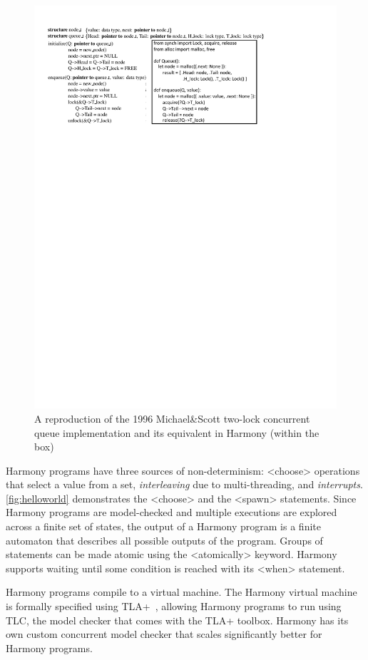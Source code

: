 \documentclass[twocolumn]{article}
\begin{document}
\begin{figure}
\begin{center}
\includegraphics[width=.9\textwidth]{MS.pdf}
\end{center}
\caption{A reproduction of the 1996 Michael\&Scott two-lock concurrent queue
implementation and its equivalent in Harmony (within the box)}
\label{fig:ms}
\end{figure}

Harmony programs have three sources of non-determinism:
<{choose}> operations that select a value from a set,
\emph{interleaving} due to multi-threading, and \emph{interrupts}.
\autoref{fig:helloworld} demonstrates the <{choose}> and the <{spawn}>
statements.  Since Harmony programs are model-checked and multiple
executions are explored across a finite set of states, the output of a
Harmony program is a finite automaton that describes all possible
outputs of the program.  Groups of statements can be made atomic
using the <{atomically}> keyword.  Harmony supports
waiting until some condition is reached with its <{when}> statement.

Harmony programs compile to a virtual machine.  The Harmony virtual
machine is formally specified using TLA+~\cite{Lamport02}, allowing
Harmony programs to run using TLC, the model checker that comes
with the TLA+ toolbox.  Harmony has its own custom concurrent model
checker that scales significantly better for Harmony programs.
\end{document}
